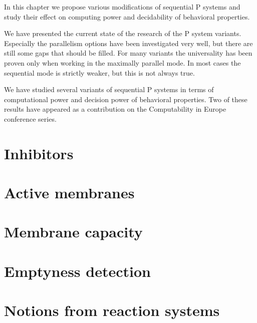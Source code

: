 In this chapter we propose various modifications of sequential P systems and study their effect on computing power and decidability of behavioral properties.

We have presented the current state of the research of the P system variants. Especially the parallelism options have been investigated very well, but there are still some gaps that should be filled. For many variants the universality has been proven only when working in the maximally parallel mode. In most cases the sequential mode is strictly weaker, but this is not always true.

We have studied several variants of sequential P systems in terms of computational power and decision power of behavioral properties. Two of these results have appeared as a contribution on the Computability in Europe conference series.

\section{Inhibitors} %
\label{sec:inhibitors}


\section{Active membranes} %
\label{sec:active_membranes}


\section{Membrane capacity} %
\label{sec:membrane_capacity}


\section{Emptyness detection} %
\label{sec:emptyness_detection}


\section{Notions from reaction systems} %
\label{sec:notions_from_reaction_systems}

